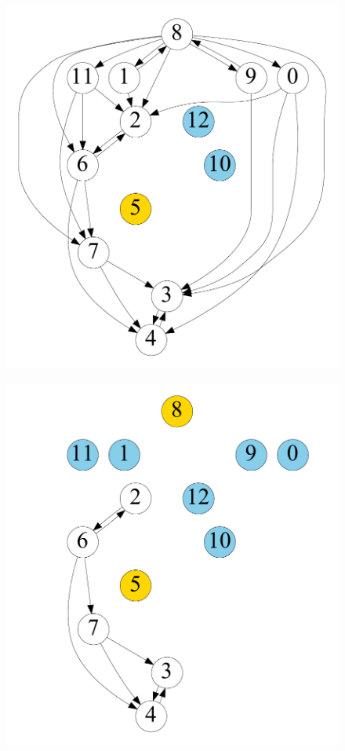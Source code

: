\begin{figure}[t]
\begin{minipage}[b]{0.19\linewidth}
        {\includegraphics[width=\textwidth]{./alg_fig/simple-g2}}
    \end{minipage}
    \begin{minipage}[b]{0.19\linewidth}
            \centering
            {\includegraphics[width=\textwidth]{./alg_fig/simple-g4}}

\end{minipage}
\end{figure}
